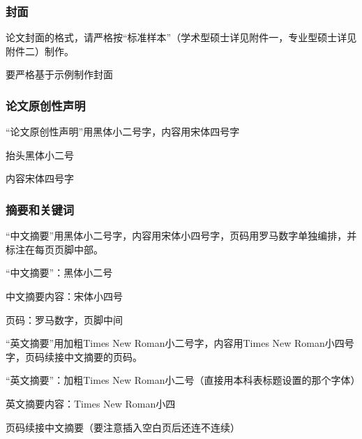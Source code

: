 \subsubsection{封面}

\begin{reference}
  论文封面的格式，请严格按“标准样本”（学术型硕士详见附件一，专业型硕士详见附件二）制作。
\end{reference}

\begin{points}
  \item 要严格基于示例制作封面
\end{points}


\subsubsection{论文原创性声明}

\begin{reference}
  “论文原创性声明”用黑体小二号字，内容用宋体四号字
\end{reference}

\begin{points}
  \item 抬头黑体小二号
  \item 内容宋体四号字
\end{points}


\subsubsection{摘要和关键词}

\begin{reference}
  “中文摘要”用黑体小二号字，内容用宋体小四号字，页码用罗马数字单独编排，并标注在每页页脚中部。
\end{reference}

\begin{points}
  \item “中文摘要”：黑体小二号
  \item 中文摘要内容：宋体小四号
  \item 页码：罗马数字，页脚中间
\end{points}

\begin{reference}
  “英文摘要”用加粗Times New Roman小二号字，内容用Times New Roman小四号字，页码续接中文摘要的页码。
\end{reference}

\begin{points}
  \item “英文摘要”：加粗Times New Roman小二号（直接用本科表标题设置的那个字体）
  \item 英文摘要内容：Times New Roman小四
  \item 页码续接中文摘要（要注意插入空白页后还连不连续）
\end{points}

